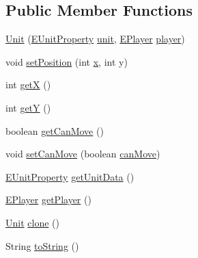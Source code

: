 \subsection*{Public Member Functions}
\begin{DoxyCompactItemize}
\item 
\mbox{\hyperlink{classgame_1_1board_1_1_unit_aa4decf509663321bd179b5c1c4bc6db7}{Unit}} (\mbox{\hyperlink{enumrule_engine_1_1entity_1_1_e_unit_property}{E\+Unit\+Property}} \mbox{\hyperlink{classgame_1_1board_1_1_unit_aa705b919e02dc57b8084bbdc57840f68}{unit}}, \mbox{\hyperlink{enumgame_1_1_e_player}{E\+Player}} \mbox{\hyperlink{classgame_1_1board_1_1_unit_a34d0e94c098e91431f95bdd4ae56f4e2}{player}})
\item 
void \mbox{\hyperlink{classgame_1_1board_1_1_unit_a4bcf3d2f401d0245b74909e3b6716b9d}{set\+Position}} (int \mbox{\hyperlink{classgame_1_1board_1_1_unit_a98cffe207391fa08955cd64f71044e38}{x}}, int y)
\item 
int \mbox{\hyperlink{classgame_1_1board_1_1_unit_a83e3e2551f8750d2107e366e279adb4d}{getX}} ()
\item 
int \mbox{\hyperlink{classgame_1_1board_1_1_unit_a99a707f9342b07b4342ffec748696d27}{getY}} ()
\item 
boolean \mbox{\hyperlink{classgame_1_1board_1_1_unit_ae0c9711da7c05804afe511b537b3c27a}{get\+Can\+Move}} ()
\item 
void \mbox{\hyperlink{classgame_1_1board_1_1_unit_af48f7f9ba375e39248eb6ab8a3f1f6de}{set\+Can\+Move}} (boolean \mbox{\hyperlink{classgame_1_1board_1_1_unit_a56718dfd790432ee280596574f6f954e}{can\+Move}})
\item 
\mbox{\hyperlink{enumrule_engine_1_1entity_1_1_e_unit_property}{E\+Unit\+Property}} \mbox{\hyperlink{classgame_1_1board_1_1_unit_a165d186d9ffb91527d90807134dbe212}{get\+Unit\+Data}} ()
\item 
\mbox{\hyperlink{enumgame_1_1_e_player}{E\+Player}} \mbox{\hyperlink{classgame_1_1board_1_1_unit_a4af824248a4efde17c956b608b338591}{get\+Player}} ()
\item 
\mbox{\hyperlink{classgame_1_1board_1_1_unit}{Unit}} \mbox{\hyperlink{classgame_1_1board_1_1_unit_ad4f3140a22fc3d4dfb3ecaede3e15d8b}{clone}} ()
\item 
String \mbox{\hyperlink{classgame_1_1board_1_1_unit_a5f70549b97f3d51a32047258ee566e6d}{to\+String}} ()
\end{DoxyCompactItemize}
